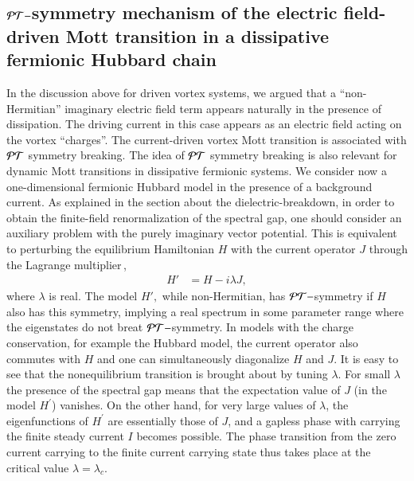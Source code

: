 \documentclass[aps,twocolumn,prl,10pt,amsmath,amssymb,nofootinbib,showpacs,superscriptaddress,floatfix]{revtex4-1}
\begin{document}
\subsection{${\cal PT}-$symmetry mechanism of the electric field-driven Mott transition
	in a dissipative fermionic Hubbard chain}

In the discussion above for driven vortex systems, we argued that
a ``non-Hermitian'' imaginary electric field term appears naturally
in the presence of dissipation. The driving current in this case appears
as an electric field acting on the vortex ``charges''. The current-driven
vortex Mott transition is associated with ${\cal PT}$ symmetry breaking.
The idea of ${\cal PT}$ symmetry breaking is also relevant for dynamic
Mott transitions in dissipative fermionic systems. We consider now
a one-dimensional fermionic Hubbard model in the presence of a background
current. As explained in the section about the dielectric-breakdown, in order to
obtain the finite-field renormalization of the spectral gap, one should
consider an auxiliary problem with the purely imaginary vector potential.
This is equivalent to perturbing the equilibrium Hamiltonian $H$
with the current operator $J$ through the Lagrange multiplier\,\cite{antal,cardy},
\begin{align}
	H' & =H-i\lambda J,\label{eq:Lagrange}
\end{align}
where $\lambda$ is real. The model $H',$ while non-Hermitian, has
${\cal PT}-$symmetry if $H$ also has this symmetry, implying a real
spectrum in some parameter range where the eigenstates do not breat
${\cal PT}-$symmetry. In models with the charge conservation,
for example the Hubbard model, the current operator also commutes
with $H$ and one can simultaneously diagonalize $H$ and $J$. It
is easy to see that the nonequilibrium transition is brought about by
tuning $\lambda$. For small $\lambda$ the presence of the spectral
gap means that the expectation value of $J$ (in the model $H^{\prime}$)
vanishes. On the other hand, for very large values of $\lambda$,
the eigenfunctions of $H^{\prime}$ are essentially those of $J$, and a gapless
phase with carrying the finite steady current $I$ becomes possible. The phase
transition from the zero current carrying to the finite current carrying
state thus takes place at the critical value $\lambda=\lambda_{c}$. 
\end{document}
